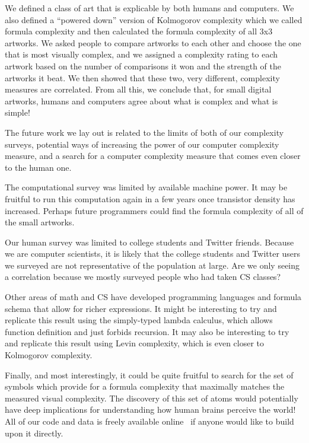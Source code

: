 \documentclass[11pt]{article}
\begin{document}
We defined a class of art that is explicable by both humans and computers.  We
also defined a ``powered down'' version of Kolmogorov complexity which we
called formula complexity and then calculated the formula complexity of all 3x3
artworks.  We asked people to compare artworks to each other and choose the one
that is most visually complex, and we assigned a complexity rating to each
artwork based on the number of comparisons it won and the strength of the
artworks it beat.  We then showed that these two, very different, complexity
measures are correlated.  From all this, we conclude that, for small digital
artworks, humans and computers agree about what is complex and what is simple!

The future work we lay out is related to the limits of both of our complexity
surveys, potential ways of increasing the power of our computer complexity
measure, and a search for a computer complexity measure that comes even closer
to the human one.

The computational survey was limited by available machine power.
It may be fruitful to run this computation again in a few years once transistor
density has increased.  Perhaps future programmers could find the formula
complexity of all of the small artworks.

Our human survey was limited to college students and Twitter friends.  Because
we are computer scientists, it is likely that the college students and
Twitter users we surveyed are not representative of the population at large.
Are we only seeing a correlation because we mostly surveyed people who had
taken CS classes? 

Other areas of math and CS have developed programming languages and formula
schema that allow for richer expressions. It might be interesting to try and
replicate this result using the simply-typed lambda calculus, which allows
function definition and just forbids recursion.  It may also be interesting to
try and replicate this result using Levin complexity, which is even closer to
Kolmogorov complexity.

Finally, and most interestingly, it could be quite fruitful to search for the
set of symbols which provide for a formula complexity that maximally matches the
measured visual complexity.  The discovery of this set of atoms would
potentially have deep implications for understanding how human brains perceive
the world!  All of our code and data is freely available online~\cite{Github} if
anyone would like to build upon it directly.

 
\end{document}
